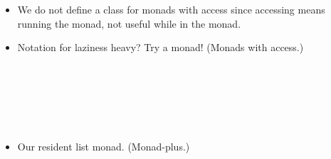 \documentclass{beamer}
\begin{document}
\begin{itemize}
  \item We do not define a class for monads with access since accessing means
  running the monad, not useful while in the monad.
  
  \item Notation for laziness heavy? Try a monad! (Monads with access.)
  
  {}{}{\hlopt{= }}{}{\hlopt{(}}{}{\hlendline{}}\\
  {\hlstd{ \ }}{}{}{}{\hlopt{= }}{}{}{}{}{}{}{\hlopt{= }}{}{\hlopt{(}}{}{}{}{\hlopt{(}}{}{\hlopt{(}}{}{}{}{\hlopt{)))}}{\hlendline{}}\\
  {\hlstd{ \ }}{}{}{\hlopt{= }}{}{}{\hlendline{}}\\
  {}{\hlopt{)}}{\hlendline{}}
  
  {}{}{\hlopt{=
  }}{}{}{}{\hlopt{(}}{}{}{}{\hlopt{)}}{\hlendline{}}\\
  
  
  \item Our resident list monad. (Monad-plus.)
  
  {}{}{\hlopt{= }}{}{\hlopt{(}}{}{\hlendline{}}\\
  {\hlstd{ \ }}{}{}{}{\hlopt{= }}{}{}{}{\hlopt{=
  }}{}{}{}{\hlopt{=
  [}}{}{\hlopt{]}}{\hlendline{}}\\
  {\hlstd{ \ }}{}{}{\hlopt{= []}}{\hlendline{}}\\
  {\hlstd{ \ }}{}{}{\hlopt{=
  }}{}{}{}{\hlendline{}}\\
  {}{\hlopt{)}}{\hlendline{}}
\end{itemize}
\end{document}
